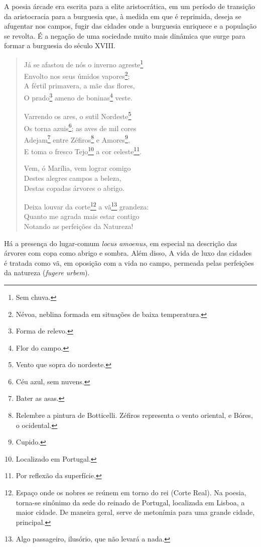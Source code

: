 A poesia árcade era escrita para a elite aristocrática, em um período de transição da aristocracia para a burguesia que, à medida em que é reprimida, deseja se afugentar nos campos, fugir das cidades onde a burguesia enriquece e a população se revolta. É a negação de uma sociedade muito mais dinâmica que surge para formar a burguesia do século XVIII.

\begin{verse}
Já se afastou de nós o inverno agreste\footnote{Sem chuva.} \\
Envolto nos seus úmidos vapores\footnote{Névoa, neblina formada em situações de baixa temperatura.}; \\
A fértil primavera, a mãe das flores, \\
O prado\footnote{Forma de relevo.} ameno de boninas\footnote{Flor do campo.} veste.
			
Varrendo os ares, o sutil Nordeste\footnote{Vento que sopra do nordeste.} \\
Os torna azuis\footnote{Céu azul, sem nuvens.}; as aves de mil cores \\
Adejam\footnote{Bater as asas.} entre Zéfiros\footnote{Relembre a pintura de Botticelli. Zéfiros representa o vento oriental, e Bóres, o ocidental.} e Amores\footnote{Cupido.}, \\
E toma o fresco Tejo\footnote{Localizado em Portugal.} a cor celeste\footnote{Por reflexão da superfície.}.
			
Vem, ó Marília, vem lograr comigo \\
Destes alegres campos a beleza, \\
Destas copadas árvores o abrigo.
			
Deixa louvar da corte\footnote{Espaço onde os nobres se reúnem em torno do rei (Corte Real). Na poesia, torna-se sinônimo da sede do reinado de Portugal, localizada em Lisboa, a maior cidade. De maneira geral, serve de metonímia para uma grande cidade, principal.} a vã\footnote{Algo passageiro, ilusório, que não levará a nada.} grandeza: \\
Quanto me agrada mais estar contigo \\
Notando as perfeições da Natureza!
\end{verse}

Há a presença do lugar-comum \textit{locus amoenus}, em especial na descrição das árvores com copa como abrigo e sombra. Além disso, A vida de luxo das cidades é tratada como vã, em oposição com a vida no campo, permeada pelas perfeições da natureza (\textit{fugere urbem}).